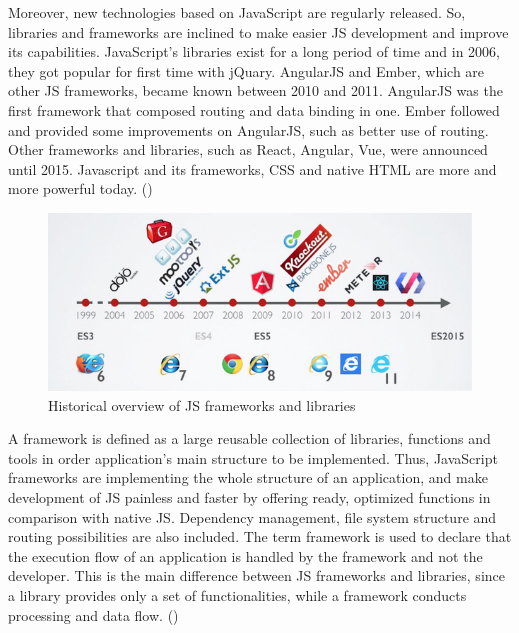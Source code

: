 Moreover, new technologies based on JavaScript are regularly released. So, libraries and frameworks are inclined to make easier JS development and improve its capabilities. JavaScript's libraries exist for a long period of time and in 2006, they got popular for first time with jQuary. AngularJS and Ember, which are other JS frameworks, became known between 2010 and 2011. AngularJS was the first framework that composed routing and data binding in one. Ember followed and provided some improvements on AngularJS, such as better use of routing. Other frameworks and libraries, such as React, Angular, Vue, were announced until 2015. Javascript and its frameworks, CSS and native HTML are more and more powerful today. (\cite{Reference6}) \par

\begin{figure}[h!]
	\begin{center}
		\includegraphics[scale=0.5]{images/history-of-frameworks.png}
	\end{center}
	\caption{Historical overview of JS frameworks and libraries}
\end{figure}

A framework is defined as a large reusable collection of libraries, functions and tools in order application's main structure to be implemented. Thus, JavaScript frameworks are implementing the whole structure of an application, and make development of JS painless and faster by offering ready, optimized functions in comparison with native JS. Dependency management, file system structure and routing possibilities are also included. The term framework is used to declare that the execution flow of an application is handled by the framework and not the developer. This is the main difference between JS frameworks and libraries, since a library provides only a set of functionalities, while a framework conducts processing and data flow. (\cite{Reference6}) \par

